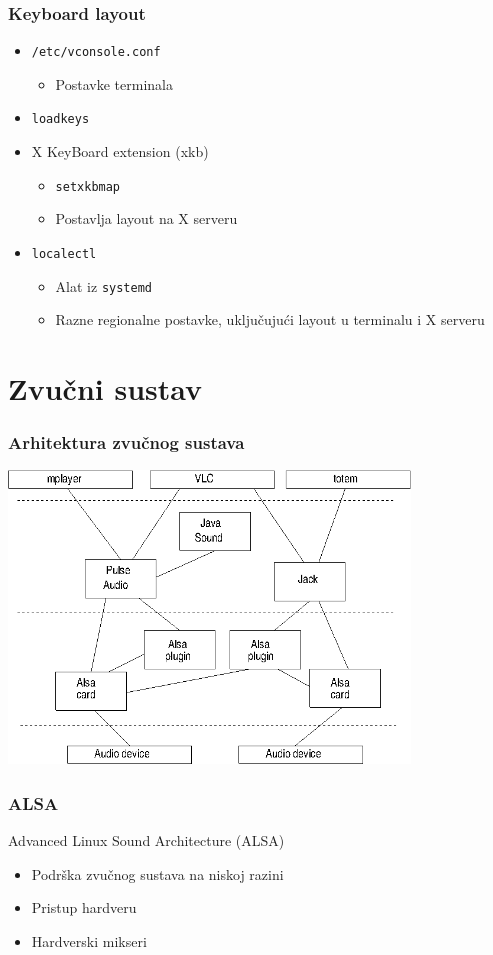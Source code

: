 \documentclass[t,table,usenames,dvipsnames]{beamer}
\begin{document}
\begin{frame}
	\frametitle{Keyboard layout}
	\begin{itemize}
		\item \texttt{/etc/vconsole.conf}
		\begin{itemize}
			\item Postavke terminala
		\end{itemize}
		\item \texttt{loadkeys}
		\item X KeyBoard extension (xkb)
		\begin{itemize}
			\item[] \texttt{setxkbmap}
			\item[] Postavlja layout na X serveru
		\end{itemize}
		\item \texttt{localectl}
		\begin{itemize}
			\item Alat iz \texttt{systemd}
			\item Razne regionalne postavke, uključujući layout u terminalu i X serveru
		\end{itemize}
	\end{itemize}
\end{frame}



\section{Zvučni sustav}


\begin{frame}
	\frametitle{Arhitektura zvučnog sustava}
	\centering
	\includegraphics[width=0.8\textwidth]{sound_arch.png}
\end{frame}


\begin{frame}
	\frametitle{ALSA}
	Advanced Linux Sound Architecture (ALSA)\\
	\vfill
	\begin{itemize}
		\item Podrška zvučnog sustava na niskoj razini
		\item Pristup hardveru
		\item Hardverski mikseri
	\end{itemize}
	\vfill
\end{frame}
\end{document}
